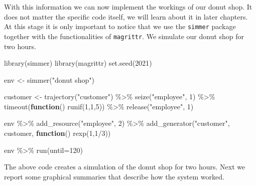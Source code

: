 \documentclass[
]{book}
\newenvironment{Shaded}{\begin{snugshade}}{\end{snugshade}}
\newcommand{\AttributeTok}[1]{\textcolor[rgb]{0.77,0.63,0.00}{#1}}
\newcommand{\ControlFlowTok}[1]{\textcolor[rgb]{0.13,0.29,0.53}{\textbf{#1}}}
\newcommand{\DecValTok}[1]{\textcolor[rgb]{0.00,0.00,0.81}{#1}}
\newcommand{\FunctionTok}[1]{\textcolor[rgb]{0.00,0.00,0.00}{#1}}
\newcommand{\NormalTok}[1]{#1}
\newcommand{\OtherTok}[1]{\textcolor[rgb]{0.56,0.35,0.01}{#1}}
\newcommand{\SpecialCharTok}[1]{\textcolor[rgb]{0.00,0.00,0.00}{#1}}
\newcommand{\StringTok}[1]{\textcolor[rgb]{0.31,0.60,0.02}{#1}}
\begin{document}
With this information we can now implement the workings of our donut shop. It does not matter the specific code itself, we will learn about it in later chapters. At this stage it is only important to notice that we use the \texttt{simmer} package together with the functionalities of \texttt{magrittr}. We simulate our donut shop for two hours.

\begin{Shaded}
\begin{Highlighting}[]
\FunctionTok{library}\NormalTok{(simmer)}
\FunctionTok{library}\NormalTok{(magrittr)}
\FunctionTok{set.seed}\NormalTok{(}\DecValTok{2021}\NormalTok{)}

\NormalTok{env }\OtherTok{\textless{}{-}}  \FunctionTok{simmer}\NormalTok{(}\StringTok{"donut shop"}\NormalTok{)}

\NormalTok{customer }\OtherTok{\textless{}{-}} \FunctionTok{trajectory}\NormalTok{(}\StringTok{"customer"}\NormalTok{) }\SpecialCharTok{\%\textgreater{}\%} \FunctionTok{seize}\NormalTok{(}\StringTok{"employee"}\NormalTok{, }\DecValTok{1}\NormalTok{) }\SpecialCharTok{\%\textgreater{}\%}
  \FunctionTok{timeout}\NormalTok{(}\ControlFlowTok{function}\NormalTok{() }\FunctionTok{runif}\NormalTok{(}\DecValTok{1}\NormalTok{,}\DecValTok{1}\NormalTok{,}\DecValTok{5}\NormalTok{)) }\SpecialCharTok{\%\textgreater{}\%} \FunctionTok{release}\NormalTok{(}\StringTok{"employee"}\NormalTok{, }\DecValTok{1}\NormalTok{) }

\NormalTok{env }\SpecialCharTok{\%\textgreater{}\%}
  \FunctionTok{add\_resource}\NormalTok{(}\StringTok{"employee"}\NormalTok{, }\DecValTok{2}\NormalTok{) }\SpecialCharTok{\%\textgreater{}\%}
  \FunctionTok{add\_generator}\NormalTok{(}\StringTok{"customer"}\NormalTok{, customer, }\ControlFlowTok{function}\NormalTok{() }\FunctionTok{rexp}\NormalTok{(}\DecValTok{1}\NormalTok{,}\DecValTok{1}\SpecialCharTok{/}\DecValTok{3}\NormalTok{))}

\NormalTok{env }\SpecialCharTok{\%\textgreater{}\%}
  \FunctionTok{run}\NormalTok{(}\AttributeTok{until=}\DecValTok{120}\NormalTok{)}
\end{Highlighting}
\end{Shaded}

The above code creates a simulation of the donut shop for two hours. Next we report some graphical summaries that describe how the system worked.
\end{document}
